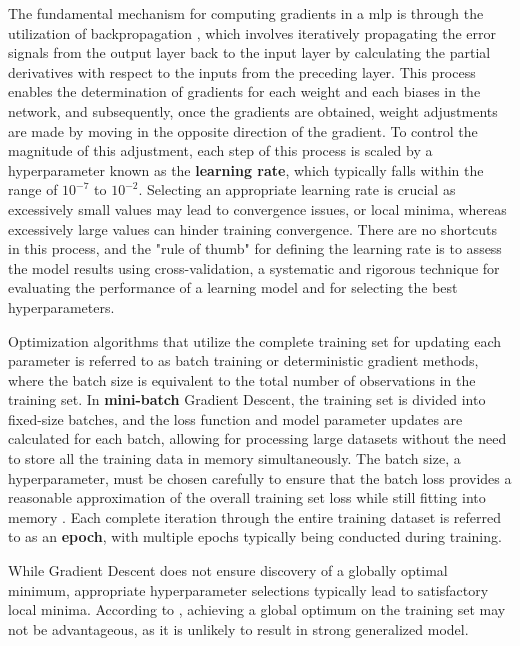 The fundamental mechanism for computing gradients in a \gls{mlp} is through the utilization of backpropagation \cite{Rumelhart1986}, which involves iteratively propagating the error signals from the output layer back to the input layer by calculating the partial derivatives with respect to the inputs from the preceding layer. This process enables the determination of gradients for each weight and each biases in the network, and subsequently, once the gradients are obtained, weight adjustments are made by moving in the opposite direction of the gradient. To control the magnitude of this adjustment, each step of this process is scaled by a hyperparameter known as the \textbf{learning rate}, which typically falls within the range of $10^{-7}$ to $10^{-2}$. Selecting an appropriate learning rate is crucial as excessively small values may lead to convergence issues, or local minima, whereas excessively large values can hinder training convergence. There are no shortcuts in this process, and the "rule of thumb" for defining the learning rate is to assess the model results using cross-validation, a systematic and rigorous technique for evaluating the performance of a learning model and for selecting the best hyperparameters.

Optimization algorithms that utilize the complete training set for updating each parameter is referred to as batch training or deterministic gradient methods, where the batch size is equivalent to the total number of observations in the training set. In \textbf{mini-batch} Gradient Descent, the training set is divided into fixed-size batches, and the loss function and model parameter updates are calculated for each batch, allowing for processing large datasets without the need to store all the training data in memory simultaneously. The batch size, a hyperparameter, must be chosen carefully to ensure that the batch loss provides a reasonable approximation of the overall training set loss while still fitting into memory \cite{Bishop2023}. Each complete iteration through the entire training dataset is referred to as an \textbf{epoch}, with multiple epochs typically being conducted during training. 

While Gradient Descent does not ensure discovery of a globally optimal minimum, appropriate hyperparameter selections typically lead to satisfactory local minima. According to \textcite{Choromanska2014}, achieving a global optimum on the training set may not be advantageous, as it is unlikely to result in strong generalized model.


